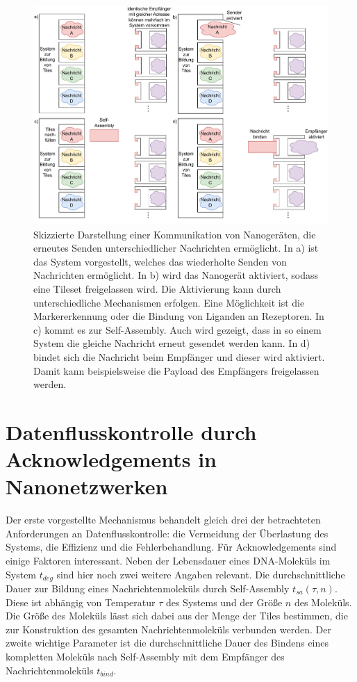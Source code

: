 \begin{figure}
    \centering
    \includegraphics[width=\textwidth]{images/Multi-Way-Communication2.pdf}
    \caption[Mehrweg Kommunikation]{Skizzierte Darstellung einer Kommunikation von Nanogeräten, die erneutes Senden unterschiedlicher Nachrichten ermöglicht. In a) ist das System vorgestellt, welches das wiederholte Senden von Nachrichten ermöglicht. In b) wird das Nanogerät aktiviert, sodass eine Tileset freigelassen wird. Die Aktivierung kann durch unterschiedliche Mechanismen erfolgen. Eine Möglichkeit ist die Markererkennung oder die Bindung von Liganden an Rezeptoren. In c) kommt es zur Self-Assembly. Auch wird gezeigt, dass in so einem System die gleiche Nachricht erneut gesendet werden kann. In d) bindet sich die Nachricht beim Empfänger und dieser wird aktiviert. Damit kann beispielsweise die Payload des Empfängers freigelassen werden.}
    \label{fig:multiwaycomm}
\end{figure}

\section{Datenflusskontrolle durch Acknowledgements in Nanonetzwerken}

Der erste vorgestellte Mechanismus behandelt gleich drei der betrachteten Anforderungen an Datenflusskontrolle: die Vermeidung der Überlastung des Systems, die Effizienz und die Fehlerbehandlung.
Für Acknowledgements sind einige Faktoren interessant. Neben der Lebensdauer eines DNA-Moleküls im System $t_{deg}$ sind hier noch zwei weitere Angaben relevant. Die durchschnittliche Dauer zur Bildung eines Nachrichtenmoleküls durch Self-Assembly $t_{sa}(\tau,n)$. Diese ist abhängig von Temperatur $\tau$ des Systems und der Größe $n$ des Moleküls. Die Größe des Moleküls lässt sich dabei aus der Menge der Tiles bestimmen, die zur Konstruktion des gesamten Nachrichtenmoleküls verbunden werden. Der zweite wichtige Parameter ist die durchschnittliche Dauer des Bindens eines kompletten Moleküls nach Self-Assembly mit dem Empfänger des Nachrichtenmoleküls $t_{bind}$.

